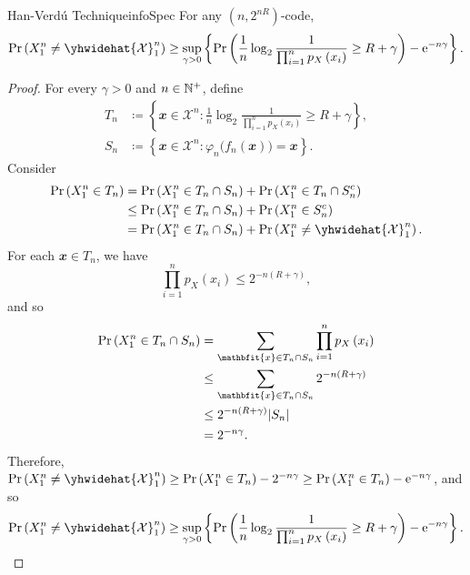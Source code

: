 \documentclass[math]{amznotes}
\theoremstyle{remark}
\newcommand{\e}{\mathrm{e}}
\begin{document}
\begin{lembox}{Han-Verd\'{u} Technique}{infoSpec}
    For any $\left(n, 2^{nR}\right)$-code, 
    \begin{equation*}
        \Pr\left(X_1^n \neq \yhwidehat{\mathcal{X}}_1^n\right) \geq \sup_{\gamma > 0}\left\{\Pr\left(\frac{1}{n}\log_2\frac{1}{\prod_{i = 1}^np_X\left(x_i\right)} \geq R + \gamma\right) - \e^{-n\gamma}\right\}.
    \end{equation*}
    \tcblower
    \begin{proof}
        For every $\gamma > 0$ and $n \in \mathbb{N}^+$, define 
        \begin{align*}
            T_n & \coloneqq \left\{\mathbfit{x} \in \mathcal{X}^n \colon \frac{1}{n}\log_2\frac{1}{\prod_{i = 1}^np_X\left(x_i\right)} \geq R + \gamma\right\}, \\
            S_n & \coloneqq \left\{\mathbfit{x} \in \mathcal{X}^n \colon \varphi_n\bigl(f_n\left(\mathbfit{x}\right)\bigr) = \mathbfit{x}\right\}.
        \end{align*}
        Consider 
        \begin{align*}
            \Pr\left(X_1^n \in T_n\right) & = \Pr\left(X_1^n \in T_n \cap S_n\right) + \Pr\left(X_1^n \in T_n \cap S_n^c\right) \\
            & \leq \Pr\left(X_1^n \in T_n \cap S_n\right) + \Pr\left(X_1^n \in S_n^c\right) \\
            & = \Pr\left(X_1^n \in T_n \cap S_n\right) + \Pr\left(X_1^n \neq \yhwidehat{\mathcal{X}}_1^n\right).
        \end{align*}
        For each $\mathbfit{x} \in T_n$, we have 
        \begin{equation*}
            \prod_{i = 1}^{n}p_X\left(x_i\right) \leq 2^{-n\left(R + \gamma\right)},
        \end{equation*}
        and so 
        \begin{align*}
            \Pr\left(X_1^n \in T_n \cap S_n\right) & = \sum_{\mathbfit{x} \in T_n \cap S_n}\prod_{i = 1}^{n}p_X\left(x_i\right) \\
            & \leq \sum_{\mathbfit{x} \in T_n \cap S_n}2^{-n\left(R + \gamma\right)} \\
            & \leq 2^{-n\left(R + \gamma\right)}\abs{S_n} \\
            & = 2^{-n\gamma}.
        \end{align*}
        Therefore, $\Pr\left(X_1^n \neq \yhwidehat{\mathcal{X}}_1^n\right) \geq \Pr\left(X_1^n \in T_n\right) - 2^{-n\gamma} \geq \Pr\left(X_1^n \in T_n\right) - \e^{-n\gamma}$, and so 
        \begin{equation*}
            \Pr\left(X_1^n \neq \yhwidehat{\mathcal{X}}_1^n\right) \geq \sup_{\gamma > 0}\left\{\Pr\left(\frac{1}{n}\log_2\frac{1}{\prod_{i = 1}^np_X\left(x_i\right)} \geq R + \gamma\right) - \e^{-n\gamma}\right\}.
        \end{equation*}
    \end{proof}
\end{lembox}
\end{document}
